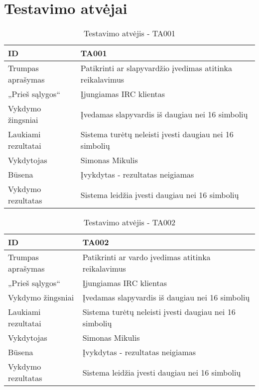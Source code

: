 \section{Testavimo atvėjai}

\begin{table}[h]
  \centering
  \label{table:TA001}
  \begin{tabular}{|l|l|}
    \hline
    ID                  & TA001                                                                  \\ \hline
    Trumpas aprašymas   & Patikrinti ar slapyvardžio įvedimas atitinka reikalavimus              \\ \hline
    „Prieš sąlygos“     & Įjungiamas IRC klientas                                                \\ \hline
    Vykdymo žingsniai   & Įvedamas slapyvardis iš daugiau nei 16 simbolių                        \\ \hline
    Laukiami rezultatai & Sistema turėtų neleisti įvesti daugiau nei 16 simbolių                 \\ \hline
    Vykdytojas          & Simonas Mikulis                                                        \\ \hline
    Būsena              & Įvykdytas - rezultatas neigiamas                                       \\ \hline
    Vykdymo rezultatas  & \cellcolor[HTML]{FF0000}Sistema leidžia įvesti daugiau nei 16 simbolių \\ \hline
  \end{tabular}
  \caption{Testavimo atvėjis - TA001}
\end{table}

\begin{table}[]
  \centering
  \label{table:TA002}
  \begin{tabular}{|l|l|}
    \hline
    ID                  & TA002                                                                  \\ \hline
    Trumpas aprašymas   & Patikrinti ar vardo įvedimas atitinka reikalavimus                     \\ \hline
    „Prieš sąlygos“     & Įjungiamas IRC klientas                                                \\ \hline
    Vykdymo žingsniai   & Įvedamas slapyvardis iš daugiau nei 16 simbolių                        \\ \hline
    Laukiami rezultatai & Sistema turėtų neleisti įvesti daugiau nei 16 simbolių                 \\ \hline
    Vykdytojas          & Simonas Mikulis                                                        \\ \hline
    Būsena              & Įvykdytas - rezultatas neigiamas                                       \\ \hline
    Vykdymo rezultatas  & \cellcolor[HTML]{FF0000}Sistema leidžia įvesti daugiau nei 16 simbolių \\ \hline
  \end{tabular}
  \caption{Testavimo atvėjis - TA002}
\end{table}

